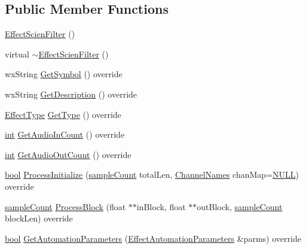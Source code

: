 \subsection*{Public Member Functions}
\begin{DoxyCompactItemize}
\item 
\hyperlink{class_effect_scien_filter_a0dc7419f62fbececa25c9c9e51a4d1fa}{Effect\+Scien\+Filter} ()
\item 
virtual \hyperlink{class_effect_scien_filter_a553e4af9d87282af9065ad5eef1128bb}{$\sim$\+Effect\+Scien\+Filter} ()
\item 
wx\+String \hyperlink{class_effect_scien_filter_aca6e80786fe6efc24186050cd877d071}{Get\+Symbol} () override
\item 
wx\+String \hyperlink{class_effect_scien_filter_a44b76cfbc0b3f63f929edb4ad9d75be3}{Get\+Description} () override
\item 
\hyperlink{_effect_interface_8h_a4809a7bb3fd1a421902a667cc1405d43}{Effect\+Type} \hyperlink{class_effect_scien_filter_afadc6818bd28d8aebbe5dbe04598153c}{Get\+Type} () override
\item 
\hyperlink{xmltok_8h_a5a0d4a5641ce434f1d23533f2b2e6653}{int} \hyperlink{class_effect_scien_filter_a64fa39ca8a309f63ddb9264ef3b43b51}{Get\+Audio\+In\+Count} () override
\item 
\hyperlink{xmltok_8h_a5a0d4a5641ce434f1d23533f2b2e6653}{int} \hyperlink{class_effect_scien_filter_ac5a0c55c7e1d3f89f846cb0c48c97d0a}{Get\+Audio\+Out\+Count} () override
\item 
\hyperlink{mac_2config_2i386_2lib-src_2libsoxr_2soxr-config_8h_abb452686968e48b67397da5f97445f5b}{bool} \hyperlink{class_effect_scien_filter_abd587907d1b000912c1cf137c3d07a72}{Process\+Initialize} (\hyperlink{include_2audacity_2_types_8h_afa427e1f521ea5ec12d054e8bd4d0f71}{sample\+Count} total\+Len, \hyperlink{include_2audacity_2_types_8h_a4f0f42a04250c39bbe0ce6cb26aa3b48}{Channel\+Names} chan\+Map=\hyperlink{px__mixer_8h_a070d2ce7b6bb7e5c05602aa8c308d0c4}{N\+U\+LL}) override
\item 
\hyperlink{include_2audacity_2_types_8h_afa427e1f521ea5ec12d054e8bd4d0f71}{sample\+Count} \hyperlink{class_effect_scien_filter_aa5586c9996237640979ea35ba34602bc}{Process\+Block} (float $\ast$$\ast$in\+Block, float $\ast$$\ast$out\+Block, \hyperlink{include_2audacity_2_types_8h_afa427e1f521ea5ec12d054e8bd4d0f71}{sample\+Count} block\+Len) override
\item 
\hyperlink{mac_2config_2i386_2lib-src_2libsoxr_2soxr-config_8h_abb452686968e48b67397da5f97445f5b}{bool} \hyperlink{class_effect_scien_filter_ae22b35d455d55cafdfd493747d5c90ab}{Get\+Automation\+Parameters} (\hyperlink{class_effect_automation_parameters}{Effect\+Automation\+Parameters} \&parms) override

\end{DoxyCompactItemize}
